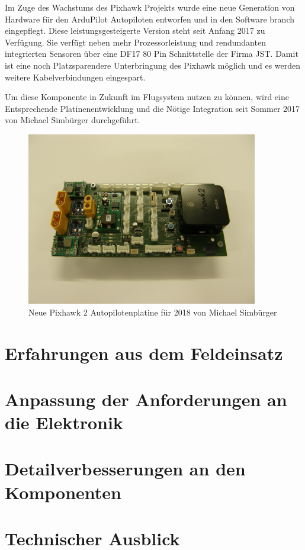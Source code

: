 Im Zuge des Wachstums des Pixhawk Projekts wurde eine neue Generation von Hardware für den ArduPilot Autopiloten entworfen und in den Software branch eingepflegt. Diese leistungsgesteigerte Version steht seit Anfang 2017 zu Verfügung.
Sie verfügt neben mehr Prozessorleistung und rendundanten integrierten Sensoren über eine DF17 80 Pin Schnittstelle der Firma JST. Damit ist eine noch Platzsparendere Unterbringung des Pixhawk möglich und es werden weitere Kabelverbindungen eingespart.

Um diese Komponente in Zukunft im Flugsystem nutzen zu können, wird eine Entsprechende Platinenentwicklung und die Nötige Integration seit Sommer 2017 von Michael Simbürger durchgeführt.

\begin{figure}[H]
\centering
\includegraphics[width=0.9\textwidth]{bilder/Fotos/Pixhawk2_Autopilot_PCB_2018_Simbuerger.jpg} 
\caption{Neue Pixhawk 2 Autopilotenplatine für 2018 von Michael Simbürger} 
\label{fig:Neue Pixhawk 2 Autopilotenplatine für 2018 von Michael Simbürger}
\end{figure}

\section{Erfahrungen aus dem Feldeinsatz}

\section{Anpassung der Anforderungen an die Elektronik}

\section{Detailverbesserungen an den Komponenten}

\section{Technischer Ausblick}